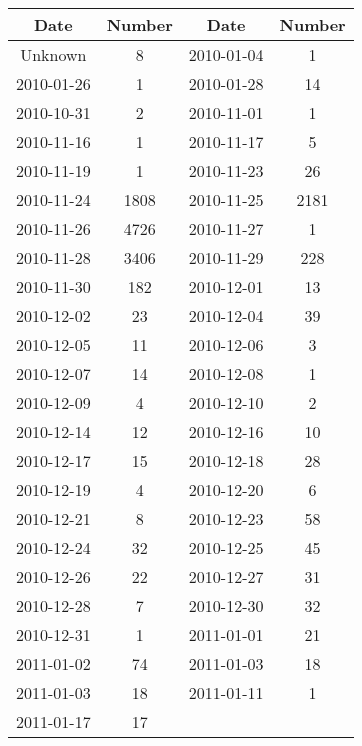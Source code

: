 \begin{center}
	\begin{tabular}{|c|c||c|c|}
	\hline Date & Number & Date & Number \\ 
	\hline Unknown & 8 & 2010-01-04 & 1 \\ 
	\hline 2010-01-26 & 1 & 2010-01-28 & 14 \\ 
	\hline 2010-10-31 & 2 & 2010-11-01 & 1 \\ 
	\hline 2010-11-16 & 1 & 2010-11-17 & 5 \\ 
	\hline 2010-11-19 & 1 & 2010-11-23 & 26 \\ 
	\hline 2010-11-24 & 1808 & 2010-11-25 & 2181 \\ 
	\hline 2010-11-26 & 4726 & 2010-11-27 & 1 \\ 
	\hline 2010-11-28 & 3406 & 2010-11-29 & 228 \\ 
	\hline 2010-11-30 & 182 & 2010-12-01 & 13 \\ 
	\hline 2010-12-02 & 23 & 2010-12-04 & 39 \\ 
	\hline 2010-12-05 & 11 & 2010-12-06 & 3 \\ 
	\hline 2010-12-07 & 14 & 2010-12-08 & 1 \\ 
	\hline 2010-12-09 & 4 & 2010-12-10 & 2 \\ 
	\hline 2010-12-14 & 12 & 2010-12-16 & 10 \\ 
	\hline 2010-12-17 & 15 & 2010-12-18 & 28 \\ 
	\hline 2010-12-19 & 4 & 2010-12-20 & 6 \\ 
	\hline 2010-12-21 & 8 & 2010-12-23 & 58 \\ 
	\hline 2010-12-24 & 32 & 2010-12-25 & 45 \\ 
	\hline 2010-12-26 & 22 & 2010-12-27 & 31 \\ 
	\hline 2010-12-28 & 7 & 2010-12-30 & 32 \\ 
	\hline 2010-12-31 & 1 & 2011-01-01 & 21 \\ 
	\hline 2011-01-02 & 74 & 2011-01-03 & 18 \\ 
	\hline 2011-01-03 & 18 & 2011-01-11 & 1 \\
	\hline 2011-01-17 & 17 &  & \\
	\hline
\end{tabular}
\end{center}